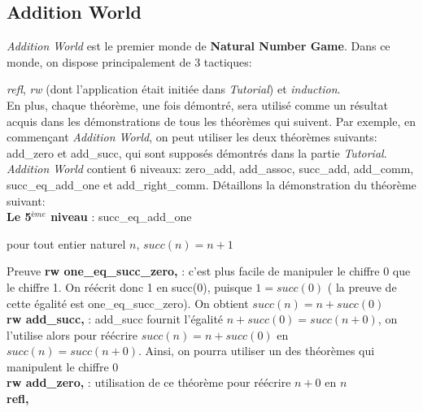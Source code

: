 \subsection{Addition World}

\textit{Addition World} est le premier monde de \textbf{Natural Number Game}. Dans ce monde, on dispose principalement de 3 tactiques: 

\textit{refl}, \textit{rw} (dont l'application était initiée dans \textit{Tutorial}) et \textit{induction}.\\
En plus, chaque théorème, une fois démontré, sera utilisé comme un résultat acquis dans les démonstrations de tous les théorèmes qui suivent. Par exemple, en commençant \textit{Addition World}, on peut utiliser les deux théorèmes suivants: add\_zero et add\_succ, qui sont supposés démontrés dans la partie \textit{Tutorial}.\\

\textit{Addition World} contient 6 niveaux: zero\_add, add\_assoc, succ\_add, add\_comm, succ\_eq\_add\_one et add\_right\_comm.
Détaillons la démonstration du théorème suivant:\\

\textbf{Le 5$^{ème}$ niveau} : succ\_eq\_add\_one \begin{center}  pour tout entier naturel $n$,  $succ(n)=n+1$ \end{center}
Preuve
\textbf{rw one\_eq\_succ\_zero,} : c'est plus facile de manipuler le chiffre 0 que le chiffre 1. On réécrit donc 1 en succ(0), puisque $1=succ(0)$ ( la preuve de cette égalité est one\_eq\_succ\_zero). On obtient $succ(n)=n+succ(0)$\\
 \textbf{rw add\_succ,} : add\_succ fournit l'égalité $n+succ(0)=succ(n+0)$, on l'utilise alors pour réécrire $succ(n)=n+succ(0)$ en $succ(n)=succ(n+0)$. Ainsi, on pourra utiliser un des théorèmes qui manipulent le chiffre 0\\
\textbf{rw add\_zero,} : utilisation de ce théorème pour réécrire $n+0$ en $n$\\
\textbf{refl,}
